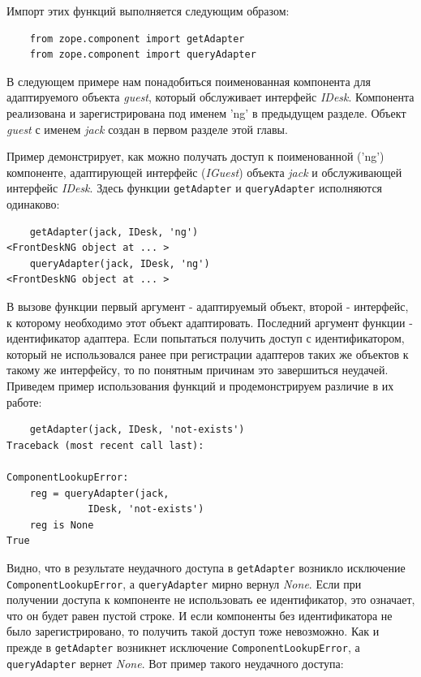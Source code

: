 \documentclass[a4paper,openany,twoside,draft]{book}
\providecommand*{\DUroletitlereference}[1]{\textsl{#1}}
\begin{document}
Импорт этих функций выполняется следующим образом:

\begin{verbatim}
    from zope.component import getAdapter
    from zope.component import queryAdapter
\end{verbatim}

В следующем примере нам понадобиться поименованная компонента для адаптируемого объекта \DUroletitlereference{guest}, который обслуживает интерфейс \DUroletitlereference{IDesk}.  Компонента реализована и зарегистрирована под именем 'ng' в предыдущем разделе.  Объект \DUroletitlereference{guest} с именем \DUroletitlereference{jack} создан в первом разделе этой главы.

Пример демонстрирует, как можно получать доступ к поименованной ('ng') компоненте, адаптирующей интерфейс (\DUroletitlereference{IGuest}) объекта \DUroletitlereference{jack} и обслуживающей интерфейс \DUroletitlereference{IDesk}.  Здесь функции \texttt{getAdapter} и \texttt{queryAdapter} исполняются одинаково:

\begin{verbatim}
    getAdapter(jack, IDesk, 'ng')
<FrontDeskNG object at ... >
    queryAdapter(jack, IDesk, 'ng')
<FrontDeskNG object at ... >
\end{verbatim}

В вызове функции первый аргумент - адаптируемый объект, второй -
интерфейс, к которому необходимо этот объект адаптировать.  Последний
аргумент функции - идентификатор адаптера.  Если попытаться получить
доступ с идентификатором, который не использовался ранее при
регистрации адаптеров таких же объектов к такому же интерфейсу, то по
понятным причинам это завершиться неудачей.  Приведем пример использования
функций и продемонстрируем различие в их работе:

\begin{verbatim}
    getAdapter(jack, IDesk, 'not-exists')
Traceback (most recent call last):

ComponentLookupError:
    reg = queryAdapter(jack,
              IDesk, 'not-exists')
    reg is None
True
\end{verbatim}

Видно, что в результате неудачного доступа в \texttt{getAdapter} возникло исключение \texttt{ComponentLookupError}, а \texttt{queryAdapter} мирно вернул \DUroletitlereference{None}.  Если при получении доступа к компоненте не использовать ее идентификатор, это означает, что он будет равен пустой строке.  И если компоненты без идентификатора не было зарегистрировано, то получить такой доступ тоже невозможно.  Как и прежде в \texttt{getAdapter} возникнет исключение \texttt{ComponentLookupError}, а \texttt{queryAdapter} вернет \DUroletitlereference{None}.  Вот пример такого неудачного доступа:
\end{document}
